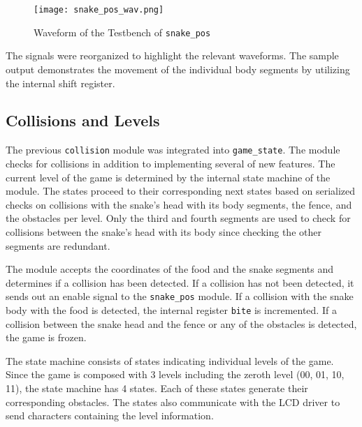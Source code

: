 \documentclass[paper=usletter, fontsize=12pt]{article}
\begin{document}
        \begin{figure}[ht]
            \begin{center}
                \texttt{[image: snake\_pos\_wav.png]}
                \caption{Waveform of the Testbench of \texttt{snake\_pos}}
                \label{fig:snake_pos_wav}
            \end{center}
        \end{figure}

        The signals were reorganized to highlight the relevant waveforms. The
        sample output demonstrates the movement of the individual body segments
        by utilizing the internal shift register.

        \subsection{Collisions and Levels} The previous \texttt{collision}
        module was integrated into \texttt{game\_state}. The module checks for
        collisions in addition to implementing several of new features. The
        current level of the game is determined by the internal state machine
        of the module. The states proceed to their corresponding next states
        based on serialized checks on collisions with the snake's head with its
        body segments, the fence, and the obstacles per level. Only the third
        and fourth segments are used to check for collisions between the
        snake's head with its body since checking the other segments are
        redundant.

        The module accepts the coordinates of the food and the snake segments
        and determines if a collision has been detected. If a collision has not
        been detected, it sends out an enable signal to the \texttt{snake\_pos}
        module. If a collision with the snake body with the food is detected,
        the internal register \texttt{bite} is incremented. If a collision
        between the snake head and the fence or any of the obstacles is
        detected, the game is frozen.

        The state machine consists of states indicating individual levels of
        the game. Since the game is composed with 3 levels including the zeroth
        level (00, 01, 10, 11), the state machine has 4 states. Each of these
        states generate their corresponding obstacles. The states also
        communicate with the LCD driver to send characters containing the level
        information.
\end{document}
